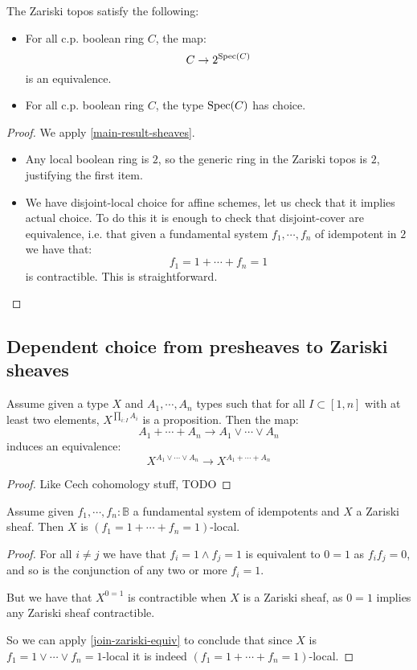\begin{proposition}
The Zariski topos satisfy the following:
\begin{itemize}
\item For all c.p. boolean ring $C$, the map:
\[C\to 2^{\operatorname{Spec}(C)}\]
is an equivalence.
\item For all c.p. boolean ring $C$, the type $\operatorname{Spec}(C)$ has choice.
\end{itemize}
\end{proposition}

\begin{proof}
We apply \cref{main-result-sheaves}. 
\begin{itemize}
\item Any local boolean ring is $2$, so the generic ring in the Zariski topos is $2$, justifying the first item.
\item We have disjoint-local choice for affine schemes, let us check that it implies actual choice. To do this it is enough to check that disjoint-cover are equivalence, i.e. that given a fundamental system $f_1,\cdots,f_n$ of idempotent in $2$ we have that:
\[f_1=1 + \cdots + f_n=1\]
is contractible. This is straightforward.
\end{itemize}
\end{proof}


\subsection{Dependent choice from presheaves to Zariski sheaves}

\begin{lemma}\label{join-zariski-equiv}
Assume given a type $X$ and $A_1,\cdots,A_n$ types such that for all $I\subset [1,n]$ with at least two elements, $X^{\prod_{i:I}A_i}$ is a proposition. Then the map:
\[A_1+\cdots+A_n \to A_1\lor\cdots \lor A_n\]
induces an equivalence:
\[X^{A_1\lor\cdots\lor A_n} \to X^{A_1+\cdots+A_n}\]
\end{lemma}

\begin{proof}
Like Cech cohomology stuff, TODO
\end{proof}

\begin{lemma}\label{zariski-sum-local}
Assume given $f_1,\cdots,f_n:\mathbb{B}$ a fundamental system of idempotents and $X$ a Zariski sheaf. Then $X$ is $(f_1=1+\cdots + f_n=1)$-local.
\end{lemma}

\begin{proof}
For all $i\not=j$ we have that $f_i=1\land f_j = 1$ is equivalent to $0=1$ as $f_if_j=0$, and so is the conjunction of any two or more $f_i=1$. 

But we have that $X^{0=1}$ is contractible when $X$ is a Zariski sheaf, as $0=1$ implies any Zariski sheaf contractible.

So we can apply \cref{join-zariski-equiv} to conclude that since $X$ is $f_1=1\lor\cdots \lor f_n=1$-local it is indeed $(f_1=1+\cdots + f_n=1)$-local.
\end{proof}

